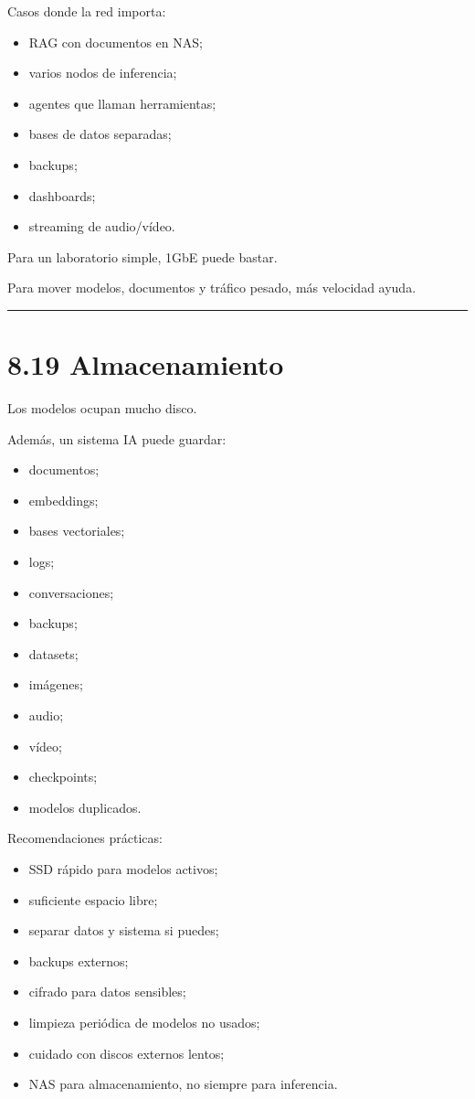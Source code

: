 Casos donde la red importa:

\begin{itemize}
\tightlist
\item
  RAG con documentos en NAS;
\item
  varios nodos de inferencia;
\item
  agentes que llaman herramientas;
\item
  bases de datos separadas;
\item
  backups;
\item
  dashboards;
\item
  streaming de audio/vídeo.
\end{itemize}

Para un laboratorio simple, 1GbE puede bastar.

Para mover modelos, documentos y tráfico pesado, más velocidad ayuda.

\begin{center}\rule{0.5\linewidth}{0.5pt}\end{center}

\section{8.19 Almacenamiento}\label{almacenamiento}

Los modelos ocupan mucho disco.

Además, un sistema IA puede guardar:

\begin{itemize}
\tightlist
\item
  documentos;
\item
  embeddings;
\item
  bases vectoriales;
\item
  logs;
\item
  conversaciones;
\item
  backups;
\item
  datasets;
\item
  imágenes;
\item
  audio;
\item
  vídeo;
\item
  checkpoints;
\item
  modelos duplicados.
\end{itemize}

Recomendaciones prácticas:

\begin{itemize}
\tightlist
\item
  SSD rápido para modelos activos;
\item
  suficiente espacio libre;
\item
  separar datos y sistema si puedes;
\item
  backups externos;
\item
  cifrado para datos sensibles;
\item
  limpieza periódica de modelos no usados;
\item
  cuidado con discos externos lentos;
\item
  NAS para almacenamiento, no siempre para inferencia.
\end{itemize}

